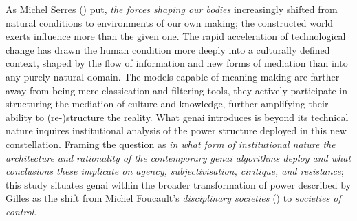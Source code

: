 


\yellowsquare
As Michel Serres (\cite*[41]{serres2019}) put, \textit{the forces shaping our bodies} increasingly
shifted from natural conditions to environments of our own making; the
constructed world exerts influence more than the given one. The rapid acceleration of technological change has drawn the human condition more deeply into a culturally defined context, shaped by the flow of information and new forms of mediation than into any purely natural domain. The models capable of meaning-making are farther away from being mere classication and filtering tools, they actively participate in structuring the mediation of culture and knowledge, further amplifying their ability to (re-)structure the reality. What \gls{genai} introduces is beyond its technical nature inquires institutional analysis \parencite{mackenzie2021} of the power structure deployed in this new constellation. Framing the question as \emph{in what form of institutional nature the architecture and rationality of the contemporary \gls{genai} algorithms deploy and what conclusions these implicate on agency, subjectivisation, ciritique, and resistance}; this study situates \gls{genai} within the broader transformation of power described by Gilles \textcite{deleuze1992a} as the shift from Michel Foucault's \emph{disciplinary societies} (\cite*{Foucault1977}) to \emph{societies of control}.

